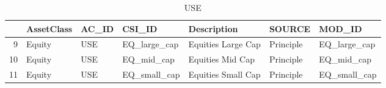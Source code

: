 \begin{longtable}{rllllll}
\caption{USE} \\ 
  \hline
 & AssetClass & AC\_ID & CSI\_ID & Description & SOURCE & MOD\_ID \\ 
  \hline
9 & Equity & USE & EQ\_large\_cap & Equities Large Cap & Principle & EQ\_large\_cap \\ 
  10 & Equity & USE & EQ\_mid\_cap & Equities Mid Cap & Principle & EQ\_mid\_cap \\ 
  11 & Equity & USE & EQ\_small\_cap & Equities Small Cap & Principle & EQ\_small\_cap \\ 
   \hline
\hline
\end{longtable}
